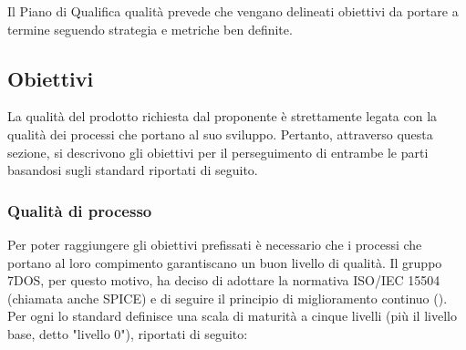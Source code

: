 Il Piano di Qualifica qualità prevede che vengano delineati obiettivi da portare a termine seguendo strategia e metriche ben definite.
\subsection{Obiettivi}
La qualità del prodotto richiesta dal proponente è strettamente legata con la qualità dei processi che portano al suo sviluppo. Pertanto, attraverso questa sezione, si descrivono gli obiettivi per il perseguimento di entrambe le parti basandosi sugli standard riportati di seguito. 
\subsubsection{Qualità di processo}
	Per poter raggiungere gli obiettivi prefissati è necessario che i processi che portano al loro compimento garantiscano un buon livello di qualità. Il gruppo 7DOS, per questo motivo, ha deciso di adottare la normativa ISO/IEC 15504 (chiamata anche SPICE) e di 	seguire il principio di miglioramento continuo (). \\ Per ogni  lo standard definisce una scala di maturità a cinque livelli (più il livello base, detto "livello 0"), riportati di seguito:
	

